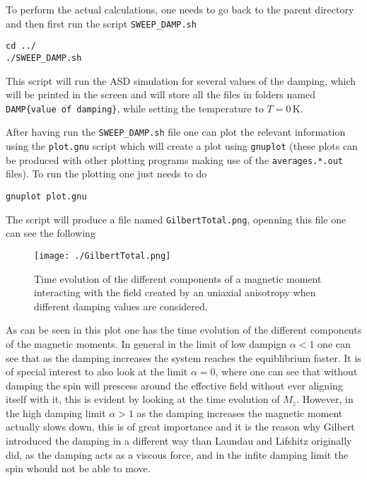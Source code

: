 \documentclass[11pt,fleqn,a4]{book} %
\begin{document}
To perform the actual calculations, one needs to go back to the parent directory and then first run the script \verb;SWEEP_DAMP.sh;

\begin{fBox} 
\begin{Verbatim}
cd ../
./SWEEP_DAMP.sh
\end{Verbatim}
\end{fBox}

This script will run the ASD simulation for several values of the damping, which will be printed in the screen and will store all the files in folders named \verb;DAMP{value of damping};, while setting the temperature to $T=0\,\text{K}$.

After having run the \verb;SWEEP_DAMP.sh; file one can plot the relevant information using the \verb;plot.gnu; script which will create a plot using \verb;gnuplot; (these plots can be produced with other plotting programs making use of the \verb;averages.*.out; files). To run the plotting one just needs to do

\begin{fBox} 
\begin{Verbatim}
gnuplot plot.gnu
\end{Verbatim}
\end{fBox}

The script will produce a file named \verb;GilbertTotal.png;, openning this file one can see the following

\begin{figure}[ht]
\center
\texttt{[image: ./GilbertTotal.png]}
\caption{Time evolution of the different components of a magnetic moment interacting with the field created by an uniaxial anisotropy when different damping values are considered.\label{fig:Gilbert}}
\end{figure}

As can be seen in this plot one has the time evolution of the different components of the magnetic moments. In general in the limit of low dampign $\alpha<1$ one can see that as the damping increases the system reaches the equiblibrium faster. It is of special interest to also look at the limit $\alpha=0$, where one can see that without damping the spin will prescess around the effective field without ever aligning itself with it, this is evident by looking at the time evolution of $M_z$. However, in the high damping limit $\alpha>1$ as the damping increases the magnetic moment actually slows down, this is of great importance and it is the reason why Gilbert introduced the damping in a different way than Laundau and Lifshitz originally did, as the damping acts as a viscous force, and in the infite damping limit the spin whould not be able to move.
\end{document}
